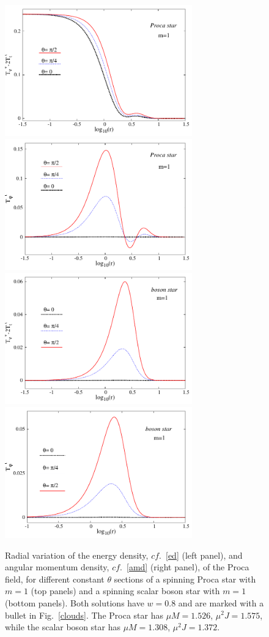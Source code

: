\begin{figure}[h!]
  \begin{center}
    \includegraphics[width=8.1cm]{papers/Proca/PS-ro-m1.pdf}
       \includegraphics[width=8.1cm]{papers/Proca/PS-T34-m1.pdf}   
        \includegraphics[width=8.1cm]{papers/Proca/BS-ro-m1.pdf}
      \includegraphics[width=8.1cm]{papers/Proca/BS-T34-m1.pdf}
  \end{center}
 \caption{Radial variation of the energy density, $cf.$~\eqref{ed} (left panel), and angular momentum density, $cf.$~\eqref{amd}  (right panel),  of the Proca field, for different constant $\theta$ sections of a spinning Proca star with $m=1$ (top panels) and a spinning scalar boson star with $m=1$ (bottom panels). Both solutions have $w=0.8$ and are marked with a bullet in Fig.~\ref{clouds}. The Proca star has $\mu M= 1.526$,  $\mu^2J= 1.575$, while the scalar boson star has $\mu M=1.308$, $\mu^2J=1.372$.}
  \label{PS1}
\end{figure}



